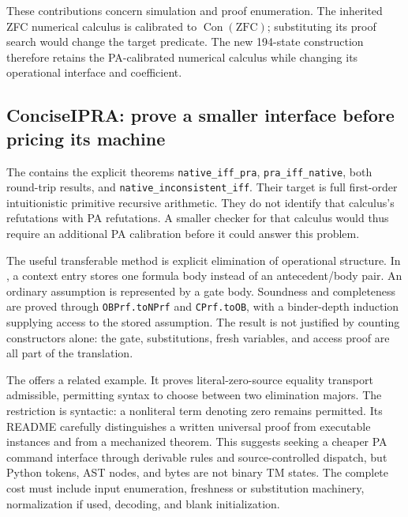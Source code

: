 These contributions concern simulation and proof enumeration.  The inherited
ZFC numerical calculus is calibrated to $\operatorname{Con}(\mathrm{ZFC})$;
substituting its proof search would change the target predicate.  The new
194-state construction therefore retains the PA-calibrated numerical calculus
while changing its operational interface and coefficient.

\subsection{ConciseIPRA: prove a smaller interface before pricing its machine}

The
contains the explicit theorems \texttt{native\_iff\_pra},
\texttt{pra\_iff\_native}, both round-trip results, and
\texttt{native\_inconsistent\_iff}.  Their target is full first-order
intuitionistic primitive recursive arithmetic.  They do not identify that
calculus's refutations with PA refutations.  A smaller checker for that
calculus would thus require an additional PA calibration before it could
answer this problem.

The useful transferable method is explicit elimination of operational
structure.  In
,
a context entry stores one formula body instead of an antecedent/body pair.
An ordinary assumption is represented by a gate body.  Soundness and
completeness are proved through \texttt{OBPrf.toNPrf} and
\texttt{CPrf.toOB}, with a binder-depth induction supplying access to the
stored assumption.  The result is not justified by counting constructors
alone: the gate, substitutions, fresh variables, and access proof are all
part of the translation.

The
offers a related example.  It proves literal-zero-source equality transport
admissible, permitting syntax to choose between two elimination majors.  The
restriction is syntactic: a nonliteral term denoting zero remains permitted.
Its README carefully distinguishes a written universal proof from executable
instances and from a mechanized theorem.  This suggests seeking a cheaper
PA command interface through derivable rules and source-controlled dispatch,
but Python tokens, AST nodes, and bytes are not binary TM states.  The complete
cost must include input enumeration, freshness or substitution machinery,
normalization if used, decoding, and blank initialization.

